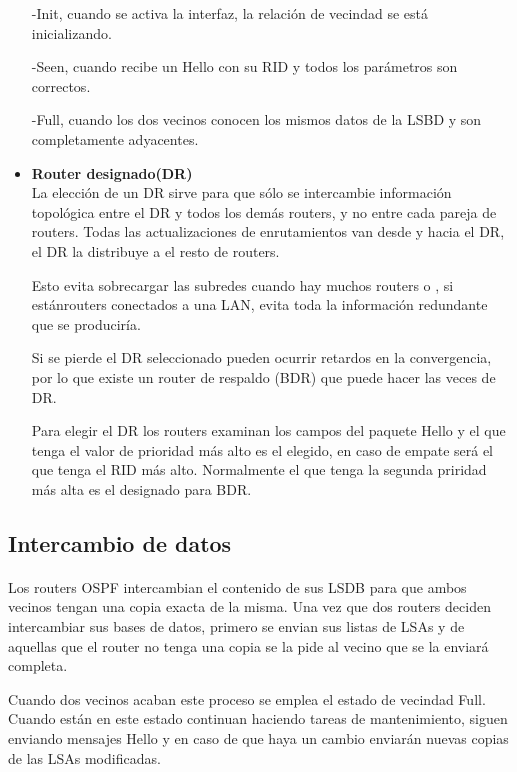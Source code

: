\documentclass[a4paper,11pt]{article}
\begin{document}
\begin{itemize}
  -Init, cuando se activa la interfaz, la relación de vecindad se está inicializando.
  
  -Seen, cuando recibe un Hello con su RID y todos los parámetros son correctos.
  
  -Full, cuando los dos vecinos conocen los mismos datos de la LSBD y son completamente adyacentes.
  
  \item \textbf{Router designado(DR)}\\
  La elección de un DR sirve para que sólo se intercambie información topológica entre el DR y todos los demás routers, y no entre cada pareja de routers. Todas las actualizaciones de enrutamientos van desde y hacia el DR, el DR la distribuye a el resto de routers.
  
  Esto evita sobrecargar las subredes cuando hay muchos routers o , si estánrouters conectados a una LAN, evita toda la información redundante que se produciría.
  
  Si se pierde el DR seleccionado pueden ocurrir retardos en la convergencia, por lo que existe un router de respaldo (BDR) que puede hacer las veces de DR.
  
  Para elegir el DR los routers examinan los campos del paquete Hello y el que tenga el valor de prioridad más alto es el elegido, en caso de empate será el que tenga el RID más alto. Normalmente el que tenga la segunda priridad más alta es el designado para BDR.
  
\end{itemize}

\subsection{Intercambio de datos}
\paragraph{  }
Los routers OSPF intercambian el contenido de sus LSDB para que ambos vecinos tengan una copia exacta de la misma. Una vez que dos routers deciden intercambiar sus bases de datos, primero se envian sus listas de LSAs y de aquellas que el router no tenga una copia se la pide al vecino que se la enviará completa.

Cuando dos vecinos acaban este proceso se emplea el estado de vecindad Full. Cuando están en este estado continuan haciendo tareas de mantenimiento, siguen enviando mensajes Hello y en caso de que haya un cambio enviarán nuevas copias de las LSAs modificadas.
\end{document}
